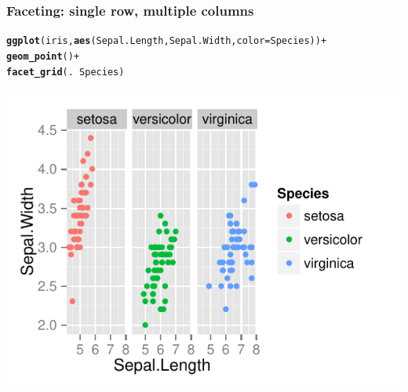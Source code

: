 \documentclass{beamer}\usepackage[]{graphicx}\usepackage[]{color}
\makeatletter
\newcommand{\hlopt}[1]{\textcolor[rgb]{0,0,0}{#1}}%
\newcommand{\hlstd}[1]{\textcolor[rgb]{0.345,0.345,0.345}{#1}}%
\newcommand{\hlkwc}[1]{\textcolor[rgb]{0.333,0.667,0.333}{#1}}%
\newcommand{\hlkwd}[1]{\textcolor[rgb]{0.737,0.353,0.396}{\textbf{#1}}}%
\newenvironment{kframe}{%
 \def\at@end@of@kframe{}%
 \ifinner\ifhmode%
  \def\at@end@of@kframe{\end{minipage}}%
  \begin{minipage}{\columnwidth}%
 \fi\fi%
 \def\FrameCommand##1{\hskip\@totalleftmargin \hskip-\fboxsep
 \colorbox{shadecolor}{##1}\hskip-\fboxsep
     \hskip-\linewidth \hskip-\@totalleftmargin \hskip\columnwidth}%
 \MakeFramed {\advance\hsize-\width
   \@totalleftmargin\z@ \linewidth\hsize
   \@setminipage}}%
 {\par\unskip\endMakeFramed%
 \at@end@of@kframe}
\newenvironment{knitrout}{}{} %
\makeatother
\begin{document}

\begin{frame}[fragile]
\frametitle{Faceting: single row, multiple columns}
\begin{knitrout}\footnotesize
{}\color{fgcolor}\begin{kframe}
\begin{alltt}
\hlkwd{ggplot}\hlstd{(iris,} \hlkwd{aes}\hlstd{(Sepal.Length, Sepal.Width,} \hlkwc{color} \hlstd{= Species))} \hlopt{+}
\hlkwd{geom_point}\hlstd{()} \hlopt{+}
\hlkwd{facet_grid}\hlstd{(.} \hlopt{~} \hlstd{Species)}
\end{alltt}
\end{kframe}

{\centering \includegraphics[width=.75\linewidth]{figure/facet_grid2} 

}



\end{knitrout}

\end{frame}

\end{document}
